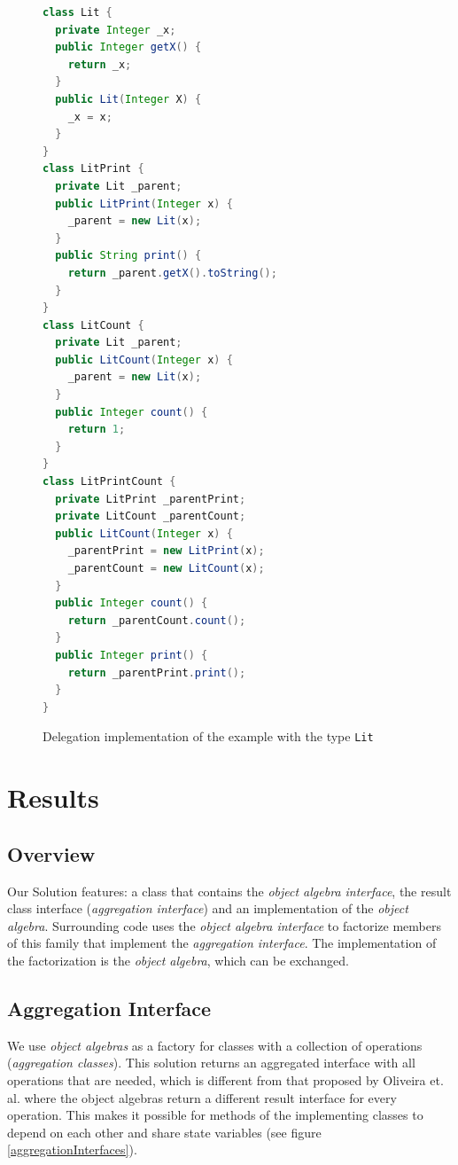 \documentclass{report}
\begin{document}
\begin{figure}[H]
\begin{lstlisting}[language=java]
class Lit {
  private Integer _x;
  public Integer getX() {
    return _x;
  }
  public Lit(Integer X) {
    _x = x;
  }
}
class LitPrint {
  private Lit _parent;
  public LitPrint(Integer x) {
    _parent = new Lit(x);
  }
  public String print() {
    return _parent.getX().toString();
  }
}
class LitCount {
  private Lit _parent;
  public LitCount(Integer x) {
    _parent = new Lit(x);
  }
  public Integer count() {
    return 1;
  }
}
class LitPrintCount {
  private LitPrint _parentPrint;
  private LitCount _parentCount;
  public LitCount(Integer x) {
    _parentPrint = new LitPrint(x);
    _parentCount = new LitCount(x);
  }
  public Integer count() {
    return _parentCount.count();
  }
  public Integer print() {
    return _parentPrint.print();
  }
}
\end{lstlisting}
\caption{Delegation implementation of the example with the type \lstinline{Lit}}
\label{delegationExample}
\end{figure}


\section{Results}

\label{suggestedEPSolution}

\subsection{Overview}

Our Solution features: a class that contains the \emph{object algebra interface}, the result class interface (\emph{aggregation interface}) and an implementation of the \emph{object algebra}. Surrounding code uses the \emph{object algebra interface} to factorize members of this family that implement the \emph{aggregation interface}. The implementation of the factorization is the \emph{object algebra}, which can be exchanged.

\subsection{Aggregation Interface}

We use \emph{object algebras} as a factory for classes with a collection of operations (\emph{aggregation classes}). This solution returns an aggregated interface with all operations that are needed, which is different from that proposed by Oliveira et. al. where the object algebras return a different result interface for every operation. This makes it possible for methods of the implementing classes to depend on each other and share state variables (see figure \ref{aggregationInterfaces}).
\end{document}

